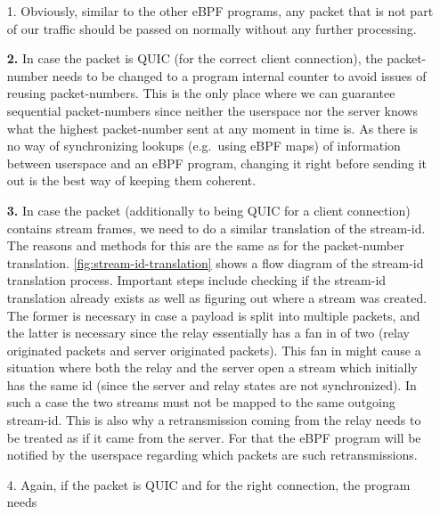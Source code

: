 \begin{enumerate}
    \item[1.]   Obviously, similar to the other eBPF programs, any packet that is not part of our traffic 
            should be passed on normally without any further processing.
    \item[\textbf{2.}] In case the packet is QUIC (for the correct client connection), the packet-number 
            needs to be changed to a program internal counter to avoid issues of reusing packet-numbers. 
            This is the only place where we can guarantee sequential packet-numbers since neither 
            the userspace nor the server knows what the highest packet-number sent at any moment in time is. 
            As there is no way of synchronizing lookups (e.g.~using eBPF maps) of information between userspace 
            and an eBPF program, changing it right before sending it out is the best way of keeping them coherent. 
    \item[\textbf{3.}] In case the packet (additionally to being QUIC for a client connection) contains 
                        stream frames, we need to do a similar translation of the stream-id.
                        The reasons and methods for this are the same as for the packet-number translation.
                        \autoref{fig:stream-id-translation} shows a flow diagram of the stream-id translation
                        process.
                        Important steps include checking if the stream-id translation already exists as well
                        as figuring out where a stream was created.
                        The former is necessary in case a payload is split into multiple packets, and the latter is 
                        necessary since the relay essentially has a fan in of two (relay originated packets and 
                        server originated packets).
                        This fan in might cause a situation where both the relay and the server open a stream which 
                        initially has the same id (since the server and relay states are not synchronized).
                        In such a case the two streams must not be mapped to the same outgoing stream-id.  
                        This is also why a retransmission coming from the relay needs to be treated as 
                        if it came from the server. For that the eBPF program will be notified by the userspace 
                        regarding which packets are such retransmissions.
    \item[4.] Again, if the packet is QUIC and for the right connection, the program needs 

\end{enumerate}
